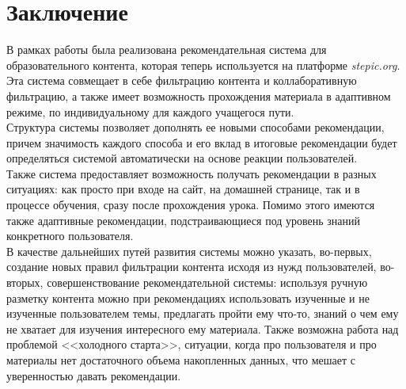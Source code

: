 \documentclass[14pt]{matmex-diploma}
\begin{document}
\section{Заключение}
\indent В рамках работы была реализована рекомендательная система для образовательного контента, которая теперь используется на платформе \textit{stepic.org}. Эта система совмещает в себе фильтрацию контента и коллаборативную фильтрацию, а также имеет возможность прохождения материала в адаптивном режиме, по индивидуальному для каждого учащегося пути. 
\\\indent Структура системы позволяет дополнять ее новыми способами рекомендации, причем значимость каждого способа и его вклад в итоговые рекомендации будет определяться системой автоматически на основе реакции пользователей.
\\\indent Также система предоставляет возможность получать рекомендации в разных ситуациях: как просто при входе на сайт, на домашней странице, так и в процессе обучения, сразу после прохождения урока. Помимо этого имеются также адаптивные рекомендации, подстраивающиеся под уровень знаний конкретного пользователя.
\\\indent В качестве дальнейших путей развития системы можно указать, во-первых, создание новых правил фильтрации контента исходя из нужд пользователей, во-вторых, совершенствование рекомендательной системы: используя ручную разметку контента можно при рекомендациях использовать изученные и не изученные пользователем темы, предлагать пройти ему что-то, знаний о чем ему не хватает для изучения интересного ему материала. Также возможна работа над проблемой <<холодного старта>>, ситуации, когда про пользователя и про материалы нет достаточного объема накопленных данных, что мешает с уверенностью давать рекомендации.













\setmonofont[Mapping=tex-text]{CMU Typewriter Text}


\end{document}
